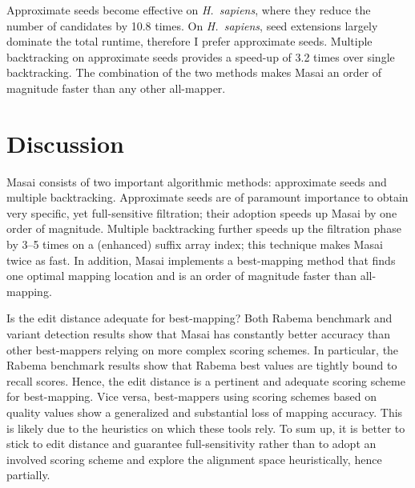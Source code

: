 Approximate seeds become effective on \emph{H.~sapiens}, where they reduce the number of candidates by 10.8 times. 
On \emph{H.~sapiens}, seed extensions largely dominate the total runtime, therefore I prefer approximate seeds.
Multiple backtracking on approximate seeds provides a speed-up of 3.2 times over single backtracking.
The combination of the two methods makes Masai an order of magnitude faster than any other all-mapper.

\begin{table*}[h]
  \center
  \caption[Masai filtration efficiency results]{
    \label{tab:masai:filtration}%
    Masai all-mapping filtration efficiency results.
    Filtering times include seeds indexing times.
    The best filtering schemes are in bold.
  }
  \resizebox{\textwidth}{!}
  {
  \sffamily
  \small
  \renewcommand{\tabcolsep}{0.8ex}
  
  }
  \vspace{2mm}
\end{table*}


\section{Discussion}

Masai consists of two important algorithmic methods: approximate seeds and multiple backtracking.
Approximate seeds are of paramount importance to obtain very specific, yet full-sensitive filtration; their adoption speeds up Masai by one order of magnitude.
Multiple backtracking further speeds up the filtration phase by 3--5 times on a (enhanced) suffix array index; this technique makes Masai twice as fast.
In addition, Masai implements a best-mapping method that finds one optimal mapping location and is an order of magnitude faster than all-mapping.

Is the edit distance adequate for best-mapping?
Both Rabema benchmark and variant detection results show that Masai has constantly better accuracy than other best-mappers relying on more complex scoring schemes.
In particular, the Rabema benchmark results show that Rabema best values are tightly bound to recall scores.
Hence, the edit distance is a pertinent and adequate scoring scheme for best-mapping.
Vice versa, best-mappers using scoring schemes based on quality values show a generalized and substantial loss of mapping accuracy.
This is likely due to the heuristics on which these tools rely.
To sum up, it is better to stick to edit distance and guarantee full-sensitivity rather than to adopt an involved scoring scheme and explore the alignment space heuristically, hence partially.

